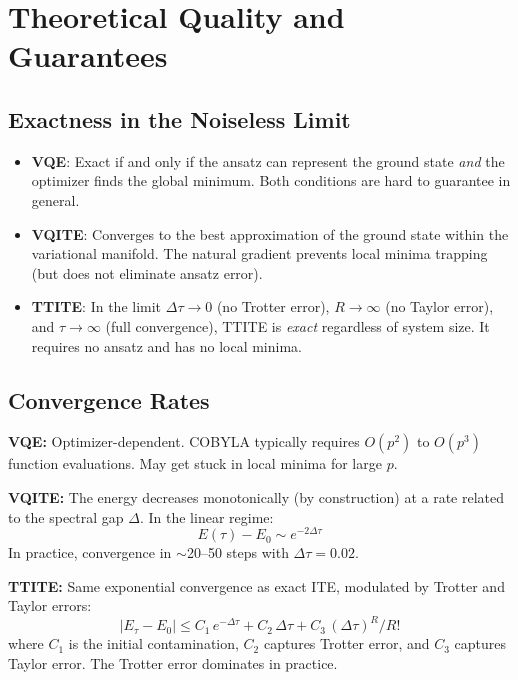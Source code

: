 \documentclass[11pt,a4paper]{article}
\begin{document}
\section{Theoretical Quality and Guarantees}
\label{sec:quality}

\subsection{Exactness in the Noiseless Limit}

\begin{itemize}[nosep]
  \item \textbf{VQE}: Exact if and only if the ansatz can represent the
    ground state \emph{and} the optimizer finds the global minimum.  Both
    conditions are hard to guarantee in general.
  \item \textbf{VQITE}: Converges to the best approximation of the ground
    state within the variational manifold.  The natural gradient prevents
    local minima trapping (but does not eliminate ansatz error).
  \item \textbf{TTITE}: In the limit $\Delta\tau \to 0$ (no Trotter error),
    $R \to \infty$ (no Taylor error), and $\tau \to \infty$ (full
    convergence), TTITE is \emph{exact} regardless of system size.  It
    requires no ansatz and has no local minima.
\end{itemize}

\subsection{Convergence Rates}

\textbf{VQE:} Optimizer-dependent.  COBYLA typically requires $O(p^2)$ to
$O(p^3)$ function evaluations.  May get stuck in local minima for large $p$.

\textbf{VQITE:} The energy decreases monotonically (by construction) at a
rate related to the spectral gap $\Delta$.  In the linear regime:
\begin{equation}
  E(\tau) - E_0 \sim e^{-2\Delta\tau}
\end{equation}
In practice, convergence in $\sim$20--50 steps with $\Delta\tau = 0.02$.

\textbf{TTITE:} Same exponential convergence as exact ITE, modulated by
Trotter and Taylor errors:
\begin{equation}
  |E_\tau - E_0| \leq C_1\,e^{-\Delta\tau} + C_2\,\Delta\tau + C_3\,(\Delta\tau)^R/R!
\end{equation}
where $C_1$ is the initial contamination, $C_2$ captures Trotter error, and
$C_3$ captures Taylor error.  The Trotter error dominates in practice.
\end{document}
